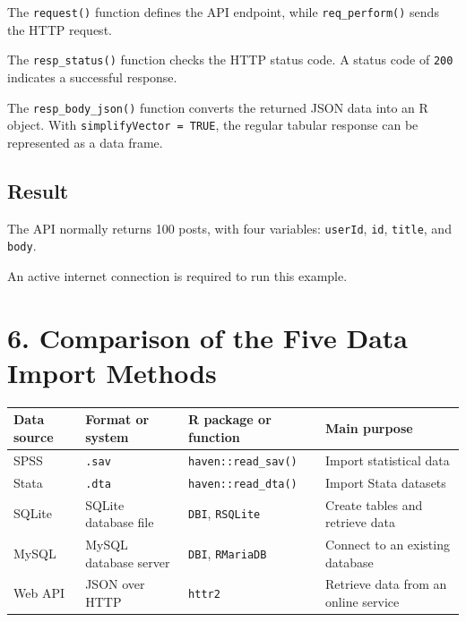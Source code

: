 \documentclass[
]{article}
\newcounter{none} %
\begin{document}
The \texttt{request()} function defines the API endpoint, while
\texttt{req\_perform()} sends the HTTP request.

The \texttt{resp\_status()} function checks the HTTP status code. A
status code of \texttt{200} indicates a successful response.

The \texttt{resp\_body\_json()} function converts the returned JSON data
into an R object. With \texttt{simplifyVector\ =\ TRUE}, the regular
tabular response can be represented as a data frame.

\subsection{Result}\label{result-4}

The API normally returns 100 posts, with four variables:
\texttt{userId}, \texttt{id}, \texttt{title}, and \texttt{body}.

An active internet connection is required to run this example.

\section{6. Comparison of the Five Data Import
Methods}\label{comparison-of-the-five-data-import-methods}

{\def\LTcaptype{none} %
\begin{longtable}[]{@{}
  >{\raggedright\arraybackslash}p{}
  >{\raggedright\arraybackslash}p{}
  >{\raggedright\arraybackslash}p{}
  >{\raggedright\arraybackslash}p{}@{}}
\toprule\noalign{}
\begin{minipage}[b]{\linewidth}\raggedright
Data source
\end{minipage} & \begin{minipage}[b]{\linewidth}\raggedright
Format or system
\end{minipage} & \begin{minipage}[b]{\linewidth}\raggedright
R package or function
\end{minipage} & \begin{minipage}[b]{\linewidth}\raggedright
Main purpose
\end{minipage} \\
\midrule\noalign{}
\endhead
\bottomrule\noalign{}
\endlastfoot
SPSS & \texttt{.sav} & \texttt{haven::read\_sav()} & Import statistical
data \\
Stata & \texttt{.dta} & \texttt{haven::read\_dta()} & Import Stata
datasets \\
SQLite & SQLite database file & \texttt{DBI}, \texttt{RSQLite} & Create
tables and retrieve data \\
MySQL & MySQL database server & \texttt{DBI}, \texttt{RMariaDB} &
Connect to an existing database \\
Web API & JSON over HTTP & \texttt{httr2} & Retrieve data from an online
service \\
\end{longtable}
}
\end{document}
